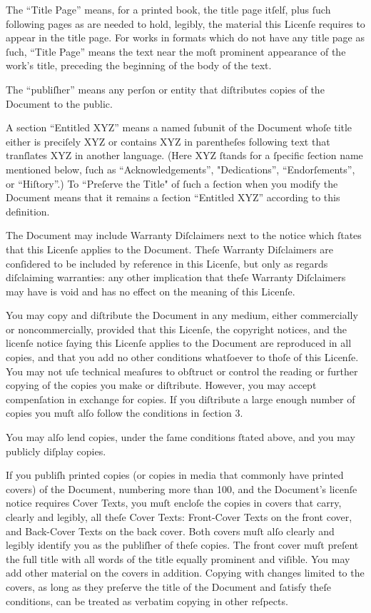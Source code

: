 The “Title Page” means, for a printed book, the title page itſelf, plus 
ſuch following pages as are needed to hold, legibly, the material this 
Licenſe requires to appear in the title page. For works in formats which 
do not have any title page as ſuch, “Title Page” means the text near the 
moſt prominent appearance of the work’s title, preceding the beginning 
of the body of the text.

The “publiſher” means any perſon or entity that diſtributes copies of 
the Document to the public.

A section “Entitled XYZ” means a named ſubunit of the Document whoſe 
title either is preciſely XYZ or contains XYZ in parentheſes following 
text that tranſlates XYZ in another language. (Here XYZ ſtands for a 
ſpecific ſection name mentioned below, ſuch as “Acknowledgements”, 
"Dedications”, “Endorſements”, or “Hiſtory”.)  To “Preſerve the Title" 
of ſuch a ſection when you modify the Document means that it remains a 
ſection “Entitled XYZ” according to this definition.

The Document may include Warranty Diſclaimers next to the notice which 
ſtates that this Licenſe applies to the Document. Theſe Warranty 
Diſclaimers are conſidered to be included by reference in this Licenſe, 
but only as regards diſclaiming warranties: any other implication that 
theſe Warranty Diſclaimers may have is void and has no effect on the 
meaning of this Licenſe.


You may copy and diſtribute the Document in any medium, either 
commercially or noncommercially, provided that this Licenſe, the 
copyright notices, and the licenſe notice ſaying this Licenſe applies to 
the Document are reproduced in all copies, and that you add no other 
conditions whatſoever to thoſe of this Licenſe. You may not uſe 
technical meaſures to obſtruct or control the reading or further copying 
of the copies you make or diſtribute. However, you may accept 
compenſation in exchange for copies. If you diſtribute a large enough 
number of copies you muſt alſo follow the conditions in ſection 3.

You may alſo lend copies, under the ſame conditions ſtated above, and 
you may publicly diſplay copies.


If you publiſh printed copies (or copies in media that commonly have 
printed covers) of the Document, numbering more than 100, and the 
Document’s licenſe notice requires Cover Texts, you muſt encloſe the 
copies in covers that carry, clearly and legibly, all theſe Cover Texts: 
Front-Cover Texts on the front cover, and Back-Cover Texts on the back 
cover. Both covers muſt alſo clearly and legibly identify you as the 
publiſher of theſe copies. The front cover muſt preſent the full title 
with all words of the title equally prominent and viſible. You may add 
other material on the covers in addition. Copying with changes limited 
to the covers, as long as they preſerve the title of the Document and 
ſatisfy theſe conditions, can be treated as verbatim copying in other 
reſpects.

